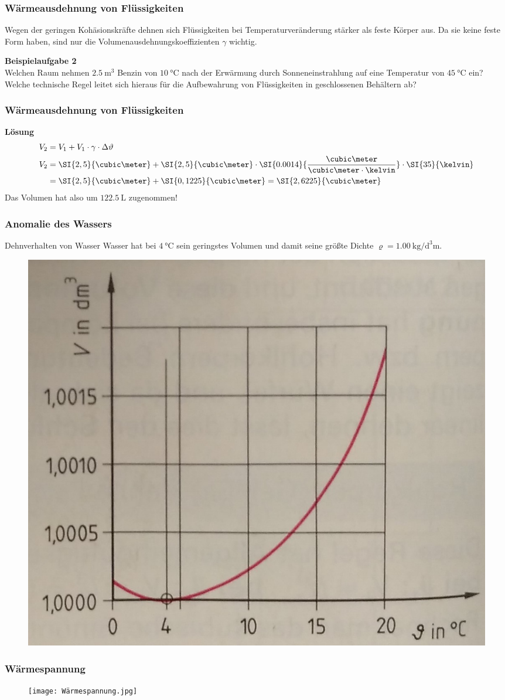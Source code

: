 \documentclass{beamer}
\begin{document}
\frame
{
  \frametitle{Wärmeausdehnung von Flüssigkeiten}
  \begin{block}{}
  Wegen der geringen Kohäsionskräfte dehnen sich Flüssigkeiten bei Temperaturveränderung stärker als feste Körper aus. Da sie keine feste Form haben, sind nur die Volumenausdehnungskoeffizienten $\gamma$ wichtig.
  \end{block}
\textbf{Beispielaufgabe 2}\\
Welchen Raum nehmen $\SI{2,5}{\cubic\meter}$ Benzin von $\SI{10}{\celsius}$ nach der Erwärmung durch Sonneneinstrahlung auf eine Temperatur von $\SI{45}{\celsius}$ ein? Welche technische Regel leitet sich hieraus für die Aufbewahrung von Flüssigkeiten in geschlossenen Behältern ab?
}

\frame
{
\frametitle{Wärmeausdehnung von Flüssigkeiten}
\textbf{Lösung}\\
\begin{align*}
V_2&=V_1+ V_1\cdot\gamma\cdot\Delta\vartheta\\
V_2&=\SI{2,5}{\cubic\meter}+\SI{2,5}{\cubic\meter}\cdot\SI{0.0014}{\frac{\cubic\meter}{\cubic\meter\cdot\kelvin}}\cdot\SI{35}{\kelvin}\\
&=\SI{2,5}{\cubic\meter}+\SI{0,1225}{\cubic\meter}=\SI{2,6225}{\cubic\meter}
\end{align*}
Das Volumen hat also um $\SI{122,5}{\liter}$ zugenommen!
}

\frame
{
\frametitle{Anomalie des Wassers}
	\begin{block}{Dehnverhalten von Wasser}
	Wasser hat bei $\SI{4}{\celsius}$ sein geringstes Volumen und damit seine größte Dichte $\varrho=\SI{1.00}{\kilo\gram\per\cubic\deci\meter}$.
	\end{block}
\begin{figure}
	\includegraphics[width=0.5\linewidth]{Anomalie.jpg}
\end{figure}
}

\frame
{
\frametitle{Wärmespannung}
\begin{figure}
	\texttt{[image: Wärmespannung.jpg]}
\end{figure}
}
\end{document}

